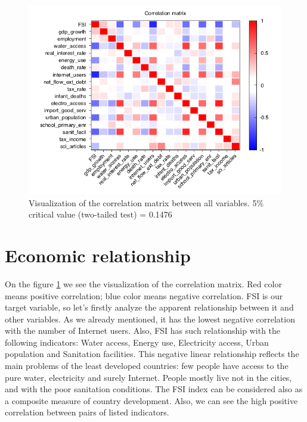 \documentclass{article}
\begin{document}
\begin{figure}[H]
\begin{center}
\includegraphics[width=1\textwidth]{corr}
\caption{Visualization of the correlation matrix between all variables. 5\% critical value (two-tailed test) = 0.1476}
\label{fig:corr}
\end{center}
\end{figure}

\section{Economic relationship}

On the figure \ref{fig:corr} we see the visualization of the correlation matrix. Red color means positive correlation; blue color means negative correlation. FSI is our target variable, so let's firstly analyze the apparent relationship between it and other variables. As we already mentioned, it has the lowest negative correlation with the number of Internet users. Also, FSI has such relationship with the following indicators: Water access, Energy use, Electricity access, Urban population and Sanitation facilities. This negative linear relationship reflects the main problems of the least developed countries: few people have access to the pure water, electricity and surely Internet. People mostly live not in the cities, and with the poor sanitation conditions. The FSI index can be considered also as a composite measure of country development. Also, we can see the high positive correlation between pairs of listed indicators.\\
\end{document}
